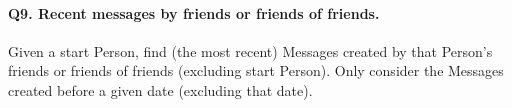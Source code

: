 \paragraph{\textbf{Q9}. Recent messages by friends or friends of friends.}
Given a start Person, find (the most recent) Messages created by that
Person's friends or friends of friends (excluding start Person). Only
consider the Messages created before a given date (excluding that date).
